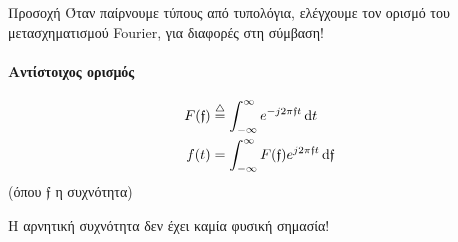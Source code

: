     \begin{attnbox}{Προσοχή}
        Όταν παίρνουμε τύπους από τυπολόγια, ελέγχουμε τον ορισμό
        του μετασχηματισμού Fourier, για διαφορές στη σύμβαση!
    \end{attnbox}

    \paragraph{Αντίστοιχος ορισμός}
    \begin{align*}
    F(\mathfrak{f}) &\overset{\triangle}{=} \int_{-\infty}^{\infty}
    e^{-j2\pi\mathfrak{f}t}\mathop{}\!\mathrm{d} t\\
    f(t) &= \int_{-\infty}^{\infty} F(\mathfrak f)e^{j2\pi\mathfrak{f}t}\mathop{}\!\mathrm{d}
    \mathfrak{f}
    \end{align*}
    (όπου \( \mathfrak{f} \) η συχνότητα)

    Η αρνητική συχνότητα δεν έχει καμία φυσική σημασία!

